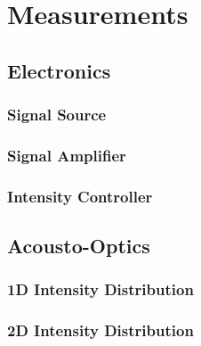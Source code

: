 \chapter{Measurements}


\section{Electronics}

\subsection{Signal Source}

\subsection{Signal Amplifier}


\subsection{Intensity Controller}


\section{Acousto-Optics}

\subsection{1D Intensity Distribution}




\subsection{2D Intensity Distribution}

